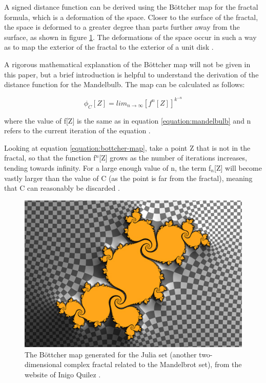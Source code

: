 A signed distance function can be derived using the B\"{o}ttcher map for the fractal formula, which is a deformation of the space. Closer to the surface of the fractal, the space is deformed to a greater degree than parts further away from the surface, as shown in figure \ref{figure:julia-bottcher-map}. The deformations of the space occur in such a way as to map the exterior of the fractal to the exterior of a unit disk \cite{quilez-distance}.\newline

A rigorous mathematical explanation of the B\"{o}ttcher map will not be given in this paper, but a brief introduction is helpful to understand the derivation of the distance function for the Mandelbulb. The map can be calculated as follows:

\begin{equation} \label{equation:bottcher-map}
	{\phi_C[Z]} = {lim_{n\rightarrow\infty}[f^n[Z]]^{k^{-n}}}
\end{equation}

where the value of f[Z] is the same as in equation \ref{equation:mandelbulb} and n refers to the current iteration of the equation \cite{marrs2021ray}.\newline

Looking at equation \ref{equation:bottcher-map}, take a point Z that is not in the fractal, so that the function f$^n$[Z] grows as the number of iterations increases, tending towards infinity. For a large enough value of n, the term f$_n$[Z] will become vastly larger than the value of C (as the point is far from the fractal), meaning that C can reasonably be discarded \cite{marrs2021ray}.

\newpage

\begin{figure} [ht]
	\centering
	\includegraphics[width=0.5\linewidth, frame]{Images/Quilez-Bottcher-Map.jpg}
	\caption{The B\"{o}ttcher map generated for the Julia set (another two-dimensional complex fractal related to the Mandelbrot set), from the website of Inigo Quilez \cite{quilez-distance}.}
	\label{figure:julia-bottcher-map}
\end{figure}

